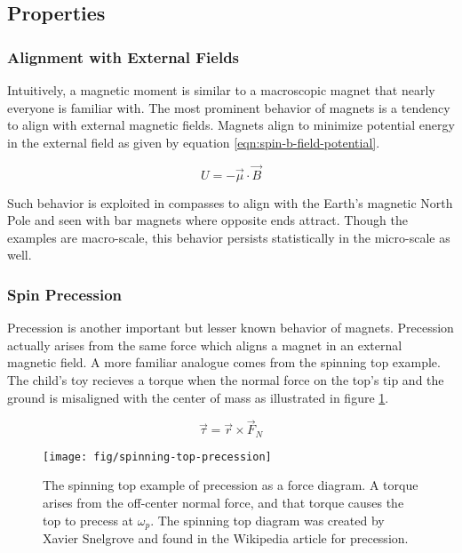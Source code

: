 \subsection{Properties}

\subsubsection{Alignment with External Fields}
Intuitively, a magnetic moment is similar to a macroscopic magnet that nearly everyone is familiar with.  The most prominent behavior of magnets is a tendency to align with external magnetic fields.  Magnets align to minimize potential energy in the external field as given by equation \ref{eqn:spin-b-field-potential}. 

\begin{equation}
\label{eqn:spin-b-field-potential}
U = -\vec{\mu} \cdot \vec{B}
\end{equation}

\noindent 
Such behavior is exploited in compasses to align with the Earth's magnetic North Pole and seen with bar magnets where opposite ends attract.  Though the examples are macro-scale, this behavior persists statistically in the micro-scale as well.

\subsubsection{Spin Precession}
Precession is another important but lesser known behavior of magnets.  Precession actually arises from the same force which aligns a magnet in an external magnetic field.  A more familiar analogue comes from the spinning top example.  The child's toy recieves a torque when the normal force on the top's tip and the ground is misaligned with the center of mass as illustrated in figure \ref{fig:spinning-top-precession}.

\begin{equation}
\label{eqn:top-torque-equation}
\vec{\tau} = \vec{r} \times \vec{F}_{N}
\end{equation}

\begin{figure}
\centering
\texttt{[image: fig/spinning-top-precession]}
\caption{
    The spinning top example of precession as a force diagram.  A torque arises from the off-center normal force, and that torque causes the top to precess at $\omega_p$.  The spinning top diagram was created by Xavier Snelgrove and found in the Wikipedia article for precession. 
    \label{fig:spinning-top-precession}
}
\end{figure}

